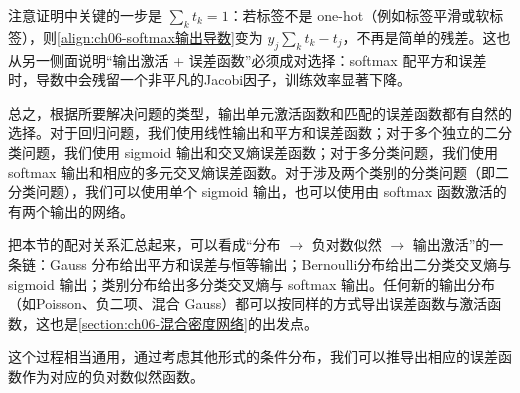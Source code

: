 \documentclass[../../main.tex]{subfiles}
\begin{document}
\begin{remark}注意证明中关键的一步是 $\sum_kt_k=1$：若标签不是 one-hot（例如标签平滑或软标签），则\eqref{align:ch06-softmax输出导数}变为 $y_j\sum_kt_k-t_j$，不再是简单的残差。这也从另一侧面说明“输出激活 + 误差函数”必须成对选择：softmax 配平方和误差时，导数中会残留一个非平凡的Jacobi因子，训练效率显著下降。
\end{remark}

总之，根据所要解决问题的类型，输出单元激活函数和匹配的误差函数都有自然的选择。对于回归问题，我们使用线性输出和平方和误差函数；对于多个独立的二分类问题，我们使用 sigmoid 输出和交叉熵误差函数；对于多分类问题，我们使用 softmax 输出和相应的多元交叉熵误差函数。对于涉及两个类别的分类问题（即二分类问题），我们可以使用单个 sigmoid 输出，也可以使用由 softmax 函数激活的有两个输出的网络。

\begin{remark}把本节的配对关系汇总起来，可以看成“分布 $\to$ 负对数似然 $\to$ 输出激活”的一条链：Gauss 分布给出平方和误差与恒等输出；Bernoulli分布给出二分类交叉熵与 sigmoid 输出；类别分布给出多分类交叉熵与 softmax 输出。任何新的输出分布（如Poisson、负二项、混合 Gauss）都可以按同样的方式导出误差函数与激活函数，这也是\cref{section:ch06-混合密度网络}的出发点。
\end{remark}

这个过程相当通用，通过考虑其他形式的条件分布，我们可以推导出相应的误差函数作为对应的负对数似然函数。
\end{document}
